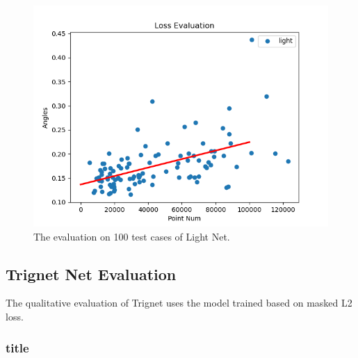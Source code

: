 \documentclass[border=15pt, multi, tikz]{article}
\begin{document}
\begin{figure}[th]
	\centering
	\includegraphics[width=0.5\linewidth]{./Figures/scatter-light-noised.png}
	\caption{The evaluation on 100 test cases of Light Net.}
	\label{fig:scatter-light}
\end{figure}



\subsection{Trignet Net Evaluation}


The qualitative evaluation of Trignet uses the model trained based on masked L2 loss.

\subsubsection{title}
\end{document}
